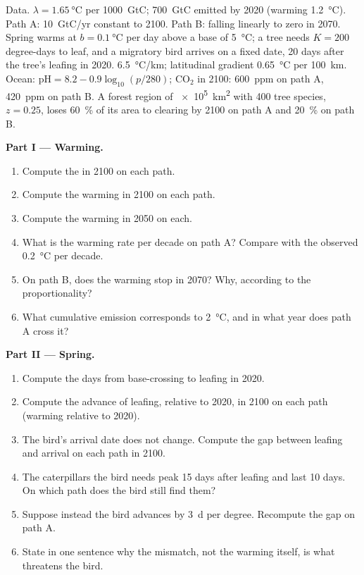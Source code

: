 \begin{problem}
\label{pb:b2:global-change:1}
Data. $\lambda = \qty{1.65}{\celsius}$ per \qty{1000}{GtC};
\qty{700}{GtC} emitted by 2020 (warming \qty{1.2}{\celsius}). Path
A: \qty{10}{GtC/yr} constant to 2100. Path B: falling linearly to
zero in 2070. Spring warms at $b = \qty{0.1}{\celsius}$ per day
above a base of \qty{5}{\celsius}; a tree needs $K = 200$
degree-days to leaf, and a migratory bird arrives on a fixed date,
20 days after the tree's leafing in 2020. 
\qty{6.5}{\celsius/km}; latitudinal gradient \qty{0.65}{\celsius}
per \qty{100}{km}. Ocean: $\mathrm{pH} = 8.2 - 0.9\log_{10}(p/280)$;
\ensuremath{\mathrm{CO_2}} in 2100: \qty{600}{ppm} on path A, \qty{420}{ppm} on path B.
A forest region of \qty{e5}{km^2} with 400 tree species, $z = 0.25$,
loses \qty{60}{\%} of its area to clearing by 2100 on path A and
\qty{20}{\%} on path B.

\medskip
\noindent\textbf{Part I --- Warming.}
\begin{enumerate}
  \item Compute the  in 2100 on each path.
  \item Compute the warming in 2100 on each path.
  \item Compute the warming in 2050 on each.
  \item What is the warming rate per decade on path A? Compare with
        the observed \qty{0.2}{\celsius} per decade.
  \item On path B, does the warming stop in 2070? Why, according
        to the proportionality?
  \item What cumulative emission corresponds to \qty{2}{\celsius},
        and in what year does path A cross it?
\end{enumerate}

\medskip
\noindent\textbf{Part II --- Spring.}
\begin{enumerate}[resume]
  \item Compute the days from base-crossing to leafing in 2020.
  \item Compute the advance of leafing, relative to 2020, in 2100
        on each path (warming relative to 2020).
  \item The bird's arrival date does not change. Compute the gap
        between leafing and arrival on each path in 2100.
  \item The caterpillars the bird needs peak 15 days after leafing
        and last 10 days. On which path does the bird still find
        them?
  \item Suppose instead the bird advances by \qty{3}{d} per
        degree. Recompute the gap on path A.
  \item State in one sentence why the mismatch, not the warming
        itself, is what threatens the bird.
\end{enumerate}


\end{problem}
